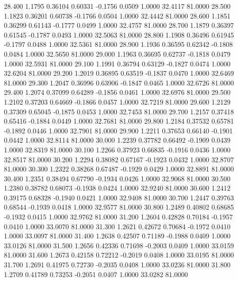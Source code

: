  28.400   1.1795   0.36104   0.60331  -0.1756   0.0509   1.0000  32.4117  81.0000
  28.500   1.1823   0.36201   0.60738  -0.1766   0.0504   1.0000  32.4442  81.0000
  28.600   1.1851   0.36299   0.61143  -0.1777   0.0499   1.0000  32.4757  81.0000
  28.700   1.1879   0.36397   0.61545  -0.1787   0.0493   1.0000  32.5063  81.0000
  28.800   1.1908   0.36496   0.61945  -0.1797   0.0488   1.0000  32.5361  81.0000
  28.900   1.1936   0.36595   0.62342  -0.1808   0.0484   1.0000  32.5650  81.0000
  29.000   1.1963   0.36695   0.62737  -0.1818   0.0479   1.0000  32.5931  81.0000
  29.100   1.1991   0.36794   0.63129  -0.1827   0.0474   1.0000  32.6204  81.0000
  29.200   1.2019   0.36895   0.63519  -0.1837   0.0470   1.0000  32.6469  81.0000
  29.300   1.2047   0.36996   0.63906  -0.1847   0.0465   1.0000  32.6726  81.0000
  29.400   1.2074   0.37099   0.64289  -0.1856   0.0461   1.0000  32.6976  81.0000
  29.500   1.2102   0.37203   0.64669  -0.1866   0.0457   1.0000  32.7219  81.0000
  29.600   1.2129   0.37309   0.65045  -0.1875   0.0453   1.0000  32.7453  81.0000
  29.700   1.2157   0.37418   0.65416  -0.1884   0.0449   1.0000  32.7681  81.0000
  29.800   1.2184   0.37532   0.65781  -0.1892   0.0446   1.0000  32.7901  81.0000
  29.900   1.2211   0.37653   0.66140  -0.1901   0.0442   1.0000  32.8114  81.0000
  30.000   1.2239   0.37782   0.66492  -0.1909   0.0439   1.0000  32.8319  81.0000
  30.100   1.2266   0.37923   0.66835  -0.1916   0.0436   1.0000  32.8517  81.0000
  30.200   1.2294   0.38082   0.67167  -0.1923   0.0432   1.0000  32.8707  81.0000
  30.300   1.2322   0.38268   0.67487  -0.1929   0.0429   1.0000  32.8891  81.0000
  30.400   1.2351   0.38494   0.67790  -0.1934   0.0426   1.0000  32.9068  81.0000
  30.500   1.2380   0.38782   0.68073  -0.1938   0.0424   1.0000  32.9240  81.0000
  30.600   1.2412   0.39175   0.68328  -0.1940   0.0421   1.0000  32.9408  81.0000
  30.700   1.2447   0.39763   0.68544  -0.1939   0.0418   1.0000  32.9577  81.0000
  30.800   1.2489   0.40802   0.68685  -0.1932   0.0415   1.0000  32.9762  81.0000
  31.200   1.2604   0.42828   0.70184  -0.1957   0.0410   1.0000  33.0070  81.0000
  31.300   1.2621   0.42672   0.70684  -0.1972   0.0410   1.0000  33.0097  81.0000
  31.400   1.2638   0.42507   0.71189  -0.1988   0.0409   1.0000  33.0126  81.0000
  31.500   1.2656   0.42336   0.71698  -0.2003   0.0409   1.0000  33.0159  81.0000
  31.600   1.2673   0.42158   0.72212  -0.2019   0.0408   1.0000  33.0195  81.0000
  31.700   1.2691   0.41975   0.72730  -0.2035   0.0408   1.0000  33.0236  81.0000
  31.800   1.2709   0.41789   0.73253  -0.2051   0.0407   1.0000  33.0282  81.0000
